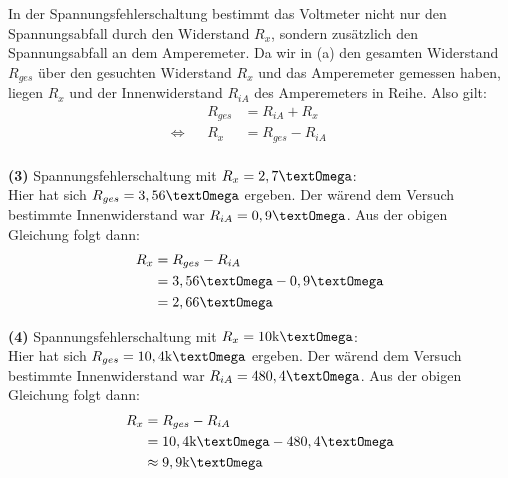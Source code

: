 \documentclass[]{article}
\newcommand{\eq}{\Leftrightarrow}
\newcommand{\unit}[1]{\text{#1}}
\begin{document}
	In der Spannungsfehlerschaltung bestimmt das Voltmeter nicht nur den Spannungsabfall durch den Widerstand $R_x$, sondern zusätzlich den Spannungsabfall an dem Amperemeter. Da wir in (a) den gesamten Widerstand $R_{ges}$ über den gesuchten Widerstand $R_x$ und das Amperemeter gemessen haben, liegen $R_x$ und der Innenwiderstand $R_{iA}$ des Amperemeters in Reihe. Also gilt:
	\begin{align*}
		&&R_{ges} &= R_{iA} + R_x &&\\
		\eq&&R_x &= R_{ges} - R_{iA} &&\\
	\end{align*}

	\textbf{(3)} Spannungsfehlerschaltung mit $R_x = 2,7\unit{\textOmega}$:\\
	Hier hat sich $R_{ges} = 3,56\unit{\textOmega}$ ergeben. Der wärend dem Versuch bestimmte Innenwiderstand war $R_{iA} = 0,9\unit{\textOmega}$. Aus der obigen Gleichung folgt dann:
	\begin{align*}
		&&R_x &= R_{ges} - R_{iA} &&\\
		&& &= 3,56\unit{\textOmega} - 0,9\unit{\textOmega}&&\\
		&& &= 2,66\unit{\textOmega}&&\\
	\end{align*}

	\textbf{(4)} Spannungsfehlerschaltung mit $R_x = 10\unit{k\textOmega}$:\\
	Hier hat sich $R_{ges} = 10,4\unit{k\textOmega}$ ergeben. Der wärend dem Versuch bestimmte Innenwiderstand war $R_{iA} = 480,4\unit{\textOmega}$. Aus der obigen Gleichung folgt dann:
	\begin{align*}
		&&R_x &= R_{ges} - R_{iA} &&\\
		&& &= 10,4\unit{k\textOmega} - 480,4\unit{\textOmega}&&\\
		&& &\approx 9,9\unit{k\textOmega}&&\\
	\end{align*}
\end{document}
